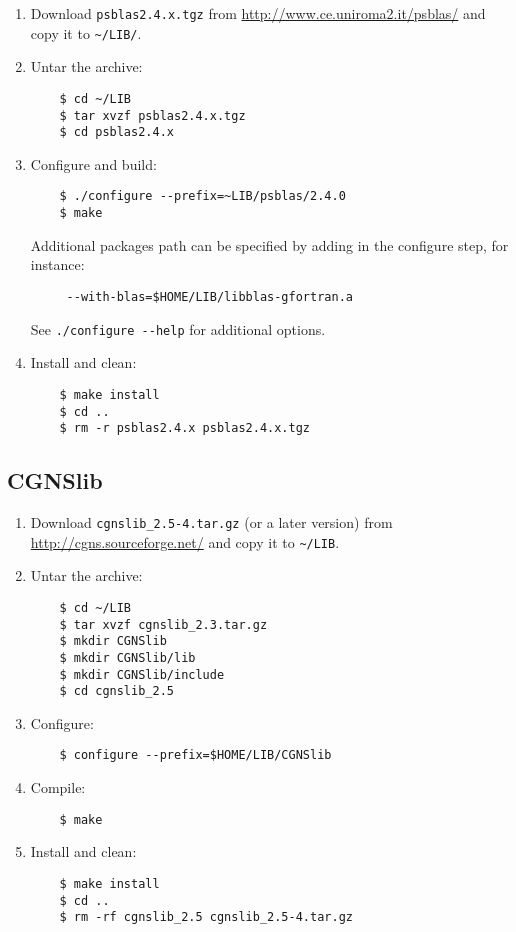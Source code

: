 \documentclass[a4paper,12pt]{article}%
\begin{document}
\begin{enumerate}
\item Download \verb+psblas2.4.x.tgz+ from
  \url{http://www.ce.uniroma2.it/psblas/} and copy it to
  \verb+~/LIB/+.
\item Untar the archive:
  \begin{Verbatim}
    $ cd ~/LIB
    $ tar xvzf psblas2.4.x.tgz
    $ cd psblas2.4.x
  \end{Verbatim}
\item Configure and build:
  \begin{Verbatim}
    $ ./configure --prefix=~LIB/psblas/2.4.0
    $ make
  \end{Verbatim}
Additional packages path can be specified by adding in the configure step, for
instance:
\begin{Verbatim}
     --with-blas=$HOME/LIB/libblas-gfortran.a
\end{Verbatim}
See \verb+./configure --help+ for additional options.
\item Install and clean:
  \begin{Verbatim}
    $ make install
    $ cd ..
    $ rm -r psblas2.4.x psblas2.4.x.tgz
  \end{Verbatim}
\end{enumerate}


\subsection{CGNSlib}

\begin{enumerate}
\item Download \verb+cgnslib_2.5-4.tar.gz+ (or a later version) from
  \url{http://cgns.sourceforge.net/} and copy it to \verb+~/LIB+.
\item Untar the archive:
  \begin{Verbatim}
    $ cd ~/LIB
    $ tar xvzf cgnslib_2.3.tar.gz
    $ mkdir CGNSlib
    $ mkdir CGNSlib/lib
    $ mkdir CGNSlib/include
    $ cd cgnslib_2.5
  \end{Verbatim}
\item Configure:
  \begin{Verbatim}
    $ configure --prefix=$HOME/LIB/CGNSlib
  \end{Verbatim}
\item Compile:
  \begin{Verbatim}
    $ make
  \end{Verbatim}
\item Install and clean:
  \begin{Verbatim}
    $ make install
    $ cd ..
    $ rm -rf cgnslib_2.5 cgnslib_2.5-4.tar.gz
  \end{Verbatim}
\end{enumerate}
\end{document}

